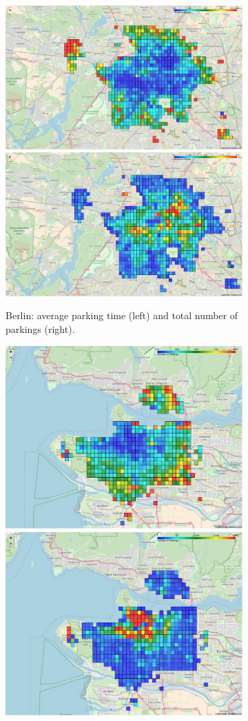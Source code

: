 \begin{figure}[t!]
    \begin{center}
        \begin{subfigure}{\textwidth}
		    \begin{center}
            \includegraphics[width=0.495\columnwidth]{figures/BerlinoAvgParking.pdf}
            \includegraphics[width=0.495\columnwidth]{figures/BerlinoMaxParking.pdf}                
            \captionsetup{justification=centering}
            \caption{Berlin: average parking time (left) and total number of  parkings (right).}
            \label{fig:6_3_heatmap_Berlin}
            \end{center}
        \end{subfigure}
        \begin{subfigure}{\textwidth}
		    \begin{center}
            \includegraphics[width=0.495\columnwidth]{figures/VancouverAvgParking.pdf}
            \includegraphics[width=0.495\columnwidth]{figures/VancouverMaxParking.pdf}

\end{center}
\end{subfigure}
\end{center}
\end{figure}
